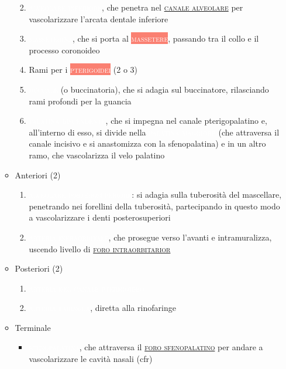 \documentclass[italian,]{article}
\providecommand{\tightlist}{%
  \setlength{\itemsep}{0pt}\setlength{\parskip}{0pt}}
\newcommand{\mus}[1]{\colorbox{Salmon}{\textcolor{white}{\textsc{#1}}}}
\newcommand{\art}[1]{\colorbox{RedOrange}{\textcolor{white}{\textsc{#1}}}}
\renewcommand{\a}[1]{\underline{\textsc{#1}}}
\begin{document}
\begin{itemize}
\begin{itemize}
    \begin{enumerate}
    \def\labelenumi{\arabic{enumi}.}
    \setcounter{enumi}{5}
    \tightlist
    \item
      \art{alveolare inferiore}, che penetra nel \a{canale alveolare}
      per vascolarizzare l'arcata dentale inferiore
    \item
      \art{masseterina}, che si porta al \mus{massetere}, passando tra
      il collo e il processo coronoideo
    \item
      Rami per i \mus{pterigoidei} (2 o 3)
    \item
      \art{buccale} (o buccinatoria), che si adagia sul buccinatore,
      rilasciando rami profondi per la guancia
    \item
      \art{palatina discendente}, che si impegna nel canale
      pterigopalatino e, all'interno di esso, si divide nella
      \art{palatina maggiore} (che attraversa il canale incisivo e si
      anastomizza con la sfenopalatina) e in un altro ramo, che
      vascolarizza il velo palatino
    \end{enumerate}
  \item
    Anteriori (2)

    \begin{enumerate}
    \def\labelenumi{\arabic{enumi}.}
    \setcounter{enumi}{10}
    \tightlist
    \item
      \art{alveolare posterosuperiore}: si adagia sulla tuberosità del
      mascellare, penetrando nei forellini della tuberosità,
      partecipando in questo modo a vascolarizzare i denti
      posterosuperiori
    \item
      \art{arteria infraorbitale}, che prosegue verso l'avanti e
      intramuralizza, uscendo livello di \a{foro intraorbitarior}
    \end{enumerate}
  \item
    Posteriori (2)

    \begin{enumerate}
    \def\labelenumi{\arabic{enumi}.}
    \setcounter{enumi}{11}
    \item
      \art{arteria del canale pterigoideo}
    \item
      \art{arteria faringea}, diretta alla rinofaringe
    \end{enumerate}
  \item
    Terminale

    \begin{itemize}
    \tightlist
    \item
      \art{sfenopalatina}, che attraversa il \a{foro sfenopalatino} per
      andare a vascolarizzare le cavità nasali (cfr)
    \end{itemize}
  \end{itemize}
\end{itemize}
\end{document}
